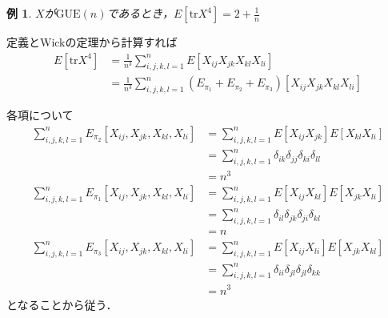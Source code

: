 \documentclass{ltjsarticle}
\makeatletter
\theoremstyle{mystyle1}
\theoremstyle{mystyle2}
\newtheorem{example}{例}
\theoremstyle{mystyle3}
\renewenvironment{proof}[1][\proofname]{\par
  \pushQED{\qed}%
  \normalfont
  \topsep6\p@\@plus6\p@ \trivlist
  \item[\hskip\labelsep{\bfseries\sffamily #1}]\ignorespaces
}{%
  \popQED\endtrivlist\@endpefalse
}
\renewcommand\proofname{証明}
\makeatother
\begin{document}
\begin{example}
    $X$が$\mathrm{GUE}(n)$であるとき，$E[\mathrm{tr}X^4]=2+\frac{1}{n}$
\end{example}

\begin{proof}
    定義とWickの定理から計算すれば
    \begin{equation}
        \begin{split}
            E[\mathrm{tr}X^4]
            & =\frac{1}{n^3}\sum_{i,j,k,l=1}^nE[X_{ij}X_{jk}X_{kl}X_{li}]                               \\
            & =\frac{1}{n^3}\sum_{i,j,k,l=1}^n(E_{\pi_1}+E_{\pi_2}+E_{\pi_3})[X_{ij}X_{jk}X_{kl}X_{li}]
        \end{split}
    \end{equation}

    各項について
    \begin{equation}
        \begin{split}
            \sum_{i,j,k,l=1}^n E_{\pi_2}[X_{ij},X_{jk},X_{kl},X_{li}]
            & =\sum_{i,j,k,l=1}^n E[X_{ij}X_{jk}]E[X_{kl}X_{li}]               \\
            & =\sum_{i,j,k,l=1}^n \delta_{ik}\delta_{jj}\delta_{ki}\delta_{ll} \\
            & =n^3
        \end{split}
    \end{equation}
    \begin{equation}
        \begin{split}
            \sum_{i,j,k,l=1}^n E_{\pi_1}[X_{ij},X_{jk},X_{kl},X_{li}]
            & =\sum_{i,j,k,l=1}^n E[X_{ij}X_{kl}]E[X_{jk}X_{li}]               \\
            & =\sum_{i,j,k,l=1}^n \delta_{il}\delta_{jk}\delta_{ji}\delta_{kl} \\
            & =n
        \end{split}
    \end{equation}
    \begin{equation}
        \begin{split}
            \sum_{i,j,k,l=1}^n E_{\pi_3}[X_{ij},X_{jk},X_{kl},X_{li}]
            & =\sum_{i,j,k,l=1}^n E[X_{ij}X_{li}]E[X_{jk}X_{kl}]               \\
            & =\sum_{i,j,k,l=1}^n \delta_{ii}\delta_{jl}\delta_{jl}\delta_{kk} \\
            & =n^3
        \end{split}
    \end{equation}
    となることから従う．


\end{proof}
\end{document}
